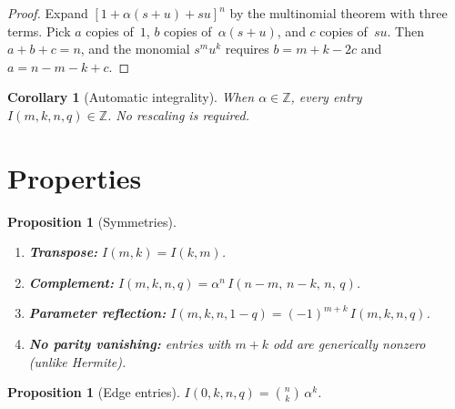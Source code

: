 \documentclass[11pt,a4paper]{article}
\theoremstyle{plain}
\newtheorem{proposition}[theorem]{Proposition}
\newtheorem{corollary}[theorem]{Corollary}
\theoremstyle{definition}
\begin{document}
\begin{proof}
Expand $[1 + \alpha(s{+}u) + su]^n$ by the multinomial theorem with
three terms. Pick $a$ copies of~$1$, $b$ copies of~$\alpha(s{+}u)$,
and $c$ copies of~$su$. Then $a + b + c = n$, and the monomial
$s^m u^k$ requires $b = m + k - 2c$ and $a = n - m - k + c$.
\end{proof}

\begin{tcolorbox}[colback=black!5, colframe=black!5, boxrule=0pt,
  sharp corners]
\begin{corollary}[Automatic integrality]\label{cor:kraw-int}
When $\alpha \in \mathbb{Z}$, every entry
$I(m, k, n, q) \in \mathbb{Z}$. No rescaling is required.
\end{corollary}
\end{tcolorbox}

\section{Properties}

\begin{tcolorbox}[colback=black!5, colframe=black!5, boxrule=0pt,
  sharp corners]
\begin{proposition}[Symmetries]\label{prop:kraw-sym}
\mbox{}
\begin{enumerate}
\item \textbf{Transpose:} $I(m,k) = I(k,m)$.
\item \textbf{Complement:}
  $I(m,k,n,q) = \alpha^n\, I(n{-}m,\, n{-}k,\, n,\, q)$.
\item \textbf{Parameter reflection:}
  $I(m,k,n,1{-}q) = (-1)^{m+k}\, I(m,k,n,q)$.
\item \textbf{No parity vanishing:}
  entries with $m+k$ odd are generically nonzero (unlike Hermite).
\end{enumerate}
\end{proposition}
\end{tcolorbox}

\begin{tcolorbox}[colback=black!5, colframe=black!5, boxrule=0pt,
  sharp corners]
\begin{proposition}[Edge entries]\label{prop:kraw-edge}
$I(0, k, n, q) = \binom{n}{k}\, \alpha^k$.
\end{proposition}
\end{tcolorbox}
\end{document}
